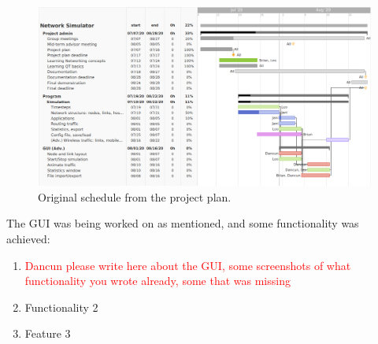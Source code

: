 \begin{figure}[!htbp]
\begin{center}
	\includegraphics[width=13cm]{originalschedule.png}
    \caption{Original schedule from the project plan.}
	\label{img:schedule}			%
\end{center}
\end{figure}

The GUI was being worked on as mentioned, and some functionality was achieved:
\begin{enumerate}
    \item \textcolor{red}{Dancun please write here about the GUI, some screenshots of what functionality you wrote already, some that was missing}
    \item Functionality 2
    \item Feature 3
\end{enumerate}

